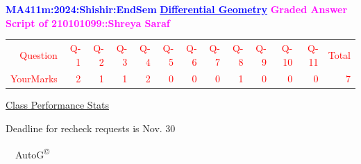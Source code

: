 \documentclass{article}                              %
\begin{document}
%
\vspace*{1in}

\begin{center}
	\textbf{\textcolor{blue}{\LARGE MA411m:2024:Shishir:EndSem}}
	\vskip 1cm
	\textbf{\textcolor{blue}{\underline{\Large Differential Geometry}}}
	\vskip 1cm
	\textbf{\textcolor{magenta}{\LARGE Graded Answer Script of 210101099::Shreya Saraf}}
\end{center}


\begin{center}
	\Huge 
	\textcolor{red}{
	\begin{tabular}{*{13}{r}}
		Question&Q-1& Q-2& Q-3& Q-4& Q-5& Q-6& Q-7& Q-8& Q-9& Q-10& Q-11&Total  \\
        	YourMarks&2&1&1&2&0&0&0&1&0&0&0&7
	\end{tabular}
	}
        \vskip 2cm
	\large
	\underline{Class Performance Stats}
	\DTLsetseparator{;}
	\begin{table}[htbp]
		\centering
	\end{table}
	\vskip 1cm
	Deadline for recheck requests is Nov. 30
\end{center}
\ \vfill \ \hfill \small AutoG\textsuperscript{\copyright}
\newpage
%
\end{document}

